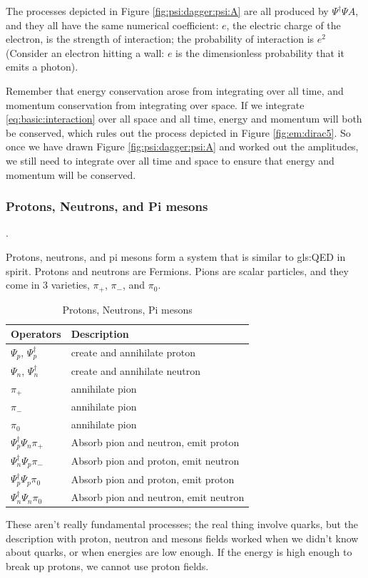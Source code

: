 \documentclass[]{article}
\begin{document}
The processes depicted in Figure \ref{fig:psi:dagger:psi:A} are all produced by $ \Psi^\dagger \Psi A$, and they all have the same numerical coefficient:
$e$, the electric charge of the electron, is the strength of interaction; the probability of interaction is $e^2$ (Consider an electron hitting a wall: $e$ is the dimensionless probability that it emits a photon).

Remember that energy conservation arose from integrating over all time, and momentum conservation from integrating over space. If we integrate \eqref{eq:basic:interaction} over all space and all time,  energy and momentum will both be conserved, which rules out the process depicted in Figure \ref{fig:em:dirac5}. So once we have drawn Figure \ref{fig:psi:dagger:psi:A} and worked out the amplitudes, we still need to integrate over all time and space to ensure that energy and momentum will be conserved.

\subsubsection{Protons, Neutrons, and Pi mesons}.

Protons, neutrons, and pi mesons form a system that is similar to \glsdesc{gls:QED} in spirit. Protons and neutrons are Fermions. Pions are scalar particles, and they come in 3 varieties, $\pi_+$, $\pi_-$, and $\pi_0$.

\begin{table}[H]
	\begin{center}
		\caption{Protons, Neutrons, Pi mesons}
		\begin{tabular}{|l|l|} \hline
			Operators &Description\\ \hline
			$\Psi_p$, $\Psi^\dagger_p$& create and annihilate proton\\ \hline
		    $\Psi_n$, $\Psi^\dagger_n$& create and annihilate neutron\\ \hline
			$\pi_+$& annihilate pion\\ \hline
			$\pi_-$&annihilate pion\\ \hline
			$\pi_0$&annihilate pion\\ \hline
			$\Psi^\dagger_p \Psi_n \pi_+$&Absorb pion and neutron, emit proton\\ \hline
			$\Psi^\dagger_n \Psi_p \pi_-$&Absorb pion and proton, emit neutron\\ \hline
			$\Psi^\dagger_p \Psi_p \pi_0$&Absorb pion and proton, emit proton\\ \hline
			$\Psi^\dagger_n \Psi_n \pi_0$&Absorb pion and neutron, emit neutron \\ \hline
		\end{tabular}
	\end{center}
\end{table}
These aren't really fundamental processes; the real thing involve quarks, but the description with proton, neutron and mesons fields worked when we didn't know about quarks, or when energies are low enough. If the energy is high enough to break up protons, we cannot use proton fields.
\end{document}
